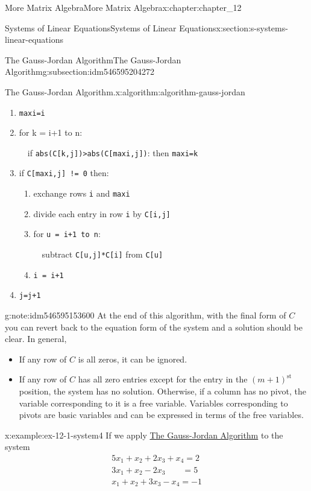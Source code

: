 \documentclass[oneside,10pt,]{book}
\newcommand{\mono}[1]{\texttt{#1}}
\numberwithin{equation}{section}
\begin{document}
\begin{chapterptx}{More Matrix Algebra}{}{More Matrix Algebra}{}{}{x:chapter:chapter_12}
\begin{sectionptx}{Systems of Linear Equations}{}{Systems of Linear Equations}{}{}{x:section:s-systems-linear-equations}
\begin{subsectionptx}{The Gauss-Jordan Algorithm}{}{The Gauss-Jordan Algorithm}{}{}{g:subsection:idm546595204272}
\begin{algorithm}{The Gauss-Jordan Algorithm.}{}{x:algorithm:algorithm-gauss-jordan}
\begin{enumerate}[label=(\arabic*)]
\begin{enumerate}[label=(\alph*)]
\item{}\mono{maxi=i}%
\item{}for k = i+1 to n:%
\par
\(\quad\)if  \mono{abs(C[k,j])>abs(C[maxi,j])}: then \mono{maxi=k}%
\item{}if \mono{C[maxi,j] != 0} then:%
\begin{enumerate}[label=(\roman*)]
\item{}exchange rows \mono{i} and \mono{maxi}%
\item{}divide each entry in row \mono{i} by \mono{C[i,j]}%
\item{}for \mono{u = i+1 to n}:%
\par
\(\quad\)subtract \mono{C[u,j]*C[i]} from \mono{C[u]}%
\item{}\mono{i = i+1}%
\end{enumerate}
%
\item{}\mono{j=j+1}%
\end{enumerate}
%
\end{enumerate}
%
\end{algorithm}
\begin{note}{}{g:note:idm546595153600}%
At the end of this algorithm, with the final form of \(C\) you can revert back to the equation form of the system and a solution should be clear. In general,%
\begin{itemize}[label=\textbullet]
\item{}If any row of \(C\) is all zeros, it can be ignored.%
\item{}If any row of \(C\) has all zero entries except for the entry in the \((m+1)^{\textrm{st}}\) position, the system has no solution.   Otherwise, if a column has no pivot, the variable corresponding to it is a free variable.  Variables corresponding to pivots are basic variables and can be expressed in terms of the free variables.%
\end{itemize}
%
\end{note}
\begin{example}{}{x:example:ex-12-1-system4}%
If we apply \hyperref[x:algorithm:algorithm-gauss-jordan]{The Gauss-Jordan Algorithm} to the system%
\begin{equation*}
\begin{array}{l}
5 x_1+x_2+2 x_3+x_4=2 \\
3 x_1+x_2-2 x_3\quad \quad=5 \\
x_1+x_2+3 x_3-x_4=-1 \\
\end{array}
\end{equation*}

\end{example}
\end{subsectionptx}
\end{sectionptx}
\end{chapterptx}
\end{document}
